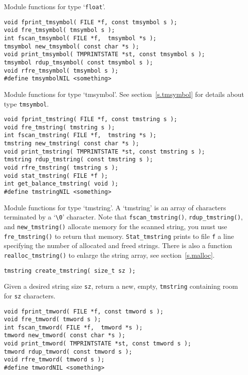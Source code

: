 \begin{desc}
Module functions for type `{\tt float}'.
\end{desc}
\begin{verbatim}
void fprint_tmsymbol( FILE *f, const tmsymbol s );
void fre_tmsymbol( tmsymbol s );
int fscan_tmsymbol( FILE *f,  tmsymbol *s );
tmsymbol new_tmsymbol( const char *s );
void print_tmsymbol( TMPRINTSTATE *st, const tmsymbol s );
tmsymbol rdup_tmsymbol( const tmsymbol s );
void rfre_tmsymbol( tmsymbol s );
#define tmsymbolNIL <something>
\end{verbatim}
\begin{desc}
Module functions for type `tmsymbol'.
See section~\ref{s.tmsymbol} for details about type \verb"tmsymbol".
\end{desc}
\begin{verbatim}
void fprint_tmstring( FILE *f, const tmstring s );
void fre_tmstring( tmstring s );
int fscan_tmstring( FILE *f,  tmstring *s );
tmstring new_tmstring( const char *s );
void print_tmstring( TMPRINTSTATE *st, const tmstring s );
tmstring rdup_tmstring( const tmstring s );
void rfre_tmstring( tmstring s );
void stat_tmstring( FILE *f );
int get_balance_tmstring( void );
#define tmstringNIL <something>
\end{verbatim}
\begin{desc}
Module functions for type `tmstring'.
A `tmstring' is an array of characters terminated by a `\verb+\0+' character.
Note that {\tt fscan\_tmstring()}, {\tt rdup\_tmstring()},
and {\tt new\_tmstring()} allocate memory for the scanned string,
you must use {\tt fre\_tmstring()} to return that memory.
{\tt Stat\_tmstring} prints to file {\tt f} a line specifying the number of
allocated and freed strings.
There is also a function \verb+realloc_tmstring()+ to enlarge the
string array,
see section~\ref{s.malloc}.
\end{desc}
\begin{verbatim}
tmstring create_tmstring( size_t sz );
\end{verbatim}
\begin{desc}
Given a desired string size \verb'sz', return a new, empty, {\tt tmstring}
containing room for \verb'sz' characters.
\end{desc}
\begin{verbatim}
void fprint_tmword( FILE *f, const tmword s );
void fre_tmword( tmword s );
int fscan_tmword( FILE *f,  tmword *s );
tmword new_tmword( const char *s );
void print_tmword( TMPRINTSTATE *st, const tmword s );
tmword rdup_tmword( const tmword s );
void rfre_tmword( tmword s );
#define tmwordNIL <something>
\end{verbatim}
